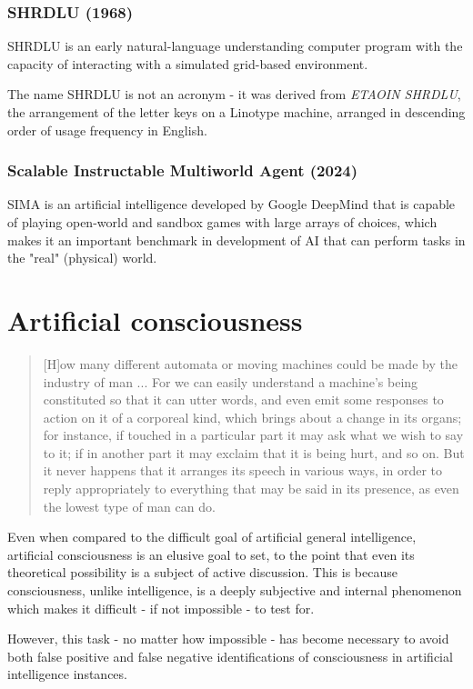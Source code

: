 \documentclass[masterthesis]{fer}
\begin{document}
\subsubsection{SHRDLU (1968)}
SHRDLU is an early natural-language understanding computer program with the capacity of interacting with a simulated grid-based environment.

The name SHRDLU is not an acronym - it was derived from \textit{ETAOIN SHRDLU}, the arrangement of the letter keys on a Linotype machine, arranged in descending order of usage frequency in English.

\subsubsection{Scalable Instructable Multiworld Agent (2024)}
SIMA is an artificial intelligence developed by Google DeepMind that is capable of playing open-world and sandbox games with large arrays of choices, which makes it an important benchmark in development of AI that can perform tasks in the "real" (physical) world.

\section{Artificial consciousness}
\begin{quote}
[H]ow many different automata or moving machines could be made by the industry of man ... For we can easily understand a machine's being constituted so that it can utter words, and even emit some responses to action on it of a corporeal kind, which brings about a change in its organs; for instance, if touched in a particular part it may ask what we wish to say to it; if in another part it may exclaim that it is being hurt, and so on. But it never happens that it arranges its speech in various ways, in order to reply appropriately to everything that may be said in its presence, as even the lowest type of man can do.
\cite{descartes1}
\end{quote}
Even when compared to the difficult goal of artificial general intelligence, artificial consciousness is an elusive goal to set, to the point that even its theoretical possibility is a subject of active discussion.
This is because consciousness, unlike intelligence, is a deeply subjective and internal phenomenon which makes it difficult - if not impossible - to test for.

However, this task - no matter how impossible - has become necessary to avoid both false positive and false negative identifications of consciousness in artificial intelligence instances.
\end{document}
